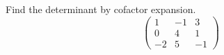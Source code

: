 \documentclass{ximera}
\author{Parisa Fatheddin}
\begin{document}
\begin{exercise}

Find the determinant by cofactor expansion. 
\[
\begin{pmatrix}
1 & -1 & 3\\
0 & 4 & 1\\
-2 & 5 & -1
\end{pmatrix}
\]








\end{exercise}
\end{document}
